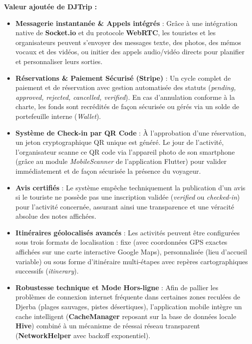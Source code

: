 \documentclass[12pt,a4paper]{report}
\begin{document}
\noindent\textbf{Valeur ajoutée de DJTrip :}
\begin{itemize}[label=\textbullet]
    \item \textbf{Messagerie instantanée \& Appels intégrés} : Grâce à une intégration native de \textbf{Socket.io} et du protocole \textbf{WebRTC}, les touristes et les organisateurs peuvent s'envoyer des messages texte, des photos, des mémos vocaux et des vidéos, ou initier des appels audio/vidéo directs pour planifier et personnaliser leurs sorties.
    \item \textbf{Réservations \& Paiement Sécurisé (Stripe)} : Un cycle complet de paiement et de réservation avec gestion automatisée des statuts (\textit{pending, approved, rejected, cancelled, verified}). En cas d'annulation conforme à la charte, les fonds sont recrédités de façon sécurisée ou gérés via un solde de portefeuille interne (\textit{Wallet}).
    \item \textbf{Système de Check-in par QR Code} : À l'approbation d'une réservation, un jeton cryptographique QR unique est généré. Le jour de l'activité, l'organisateur scanne ce QR code via l'appareil photo de son smartphone (grâce au module \textit{MobileScanner} de l’application Flutter) pour valider immédiatement et de façon sécurisée la présence du voyageur.
    \item \textbf{Avis certifiés} : Le système empêche techniquement la publication d'un avis si le touriste ne possède pas une inscription validée (\textit{verified} ou \textit{checked-in}) pour l'activité concernée, assurant ainsi une transparence et une véracité absolue des notes affichées.
    \item \textbf{Itinéraires géolocalisés avancés} : Les activités peuvent être configurées sous trois formats de localisation : fixe (avec coordonnées GPS exactes affichées sur une carte interactive Google Maps), personnalisée (lieu d'accueil variable) ou sous forme d'itinéraire multi-étapes avec repères cartographiques successifs (\textit{itinerary}).
    \item \textbf{Robustesse technique et Mode Hors-ligne} : Afin de pallier les problèmes de connexion internet fréquente dans certaines zones reculées de Djerba (plages sauvages, pistes désertiques), l’application mobile intègre un cache intelligent (\textbf{CacheManager} reposant sur la base de données locale \textbf{Hive}) combiné à un mécanisme de réessai réseau transparent (\textbf{NetworkHelper} avec backoff exponentiel).
\end{itemize}
\end{document}
